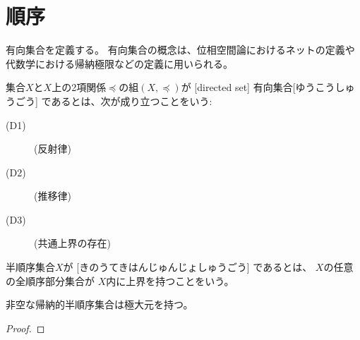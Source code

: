 \documentclass[report]{jlreq}
\begin{document}
\section{順序}

\begin{definition}[半順序]
    \TODO{}
\end{definition}

\begin{definition}[全順序]
    \TODO{}
\end{definition}

\begin{definition}[上界と下界]
    \TODO{}
\end{definition}

\begin{definition}[上限と下限]
    \TODO{}
\end{definition}

有向集合を定義する。
有向集合の概念は、位相空間論におけるネットの定義や
代数学における帰納極限などの定義に用いられる。

\begin{definition}[有向集合]
    集合$X$と$X$上の2項関係$\preceq$の組$(X, \preceq)$が
    [directed set]
        {有向集合}[ゆうこうしゅうごう]
    であるとは、次が成り立つことをいう:
    \begin{description}
        \item[(D1)] (反射律)
        \item[(D2)] (推移律)
        \item[(D3)] (共通上界の存在)
    \end{description}
    \TODO{}
\end{definition}

\begin{definition}[帰納的半順序集合]
    半順序集合$X$が
    [きのうてきはんじゅんじょしゅうごう]
    であるとは、
    $X$の任意の全順序部分集合が
    $X$内に上界を持つことをいう。
\end{definition}

\begin{theorem}
    非空な帰納的半順序集合は極大元を持つ。
\end{theorem}

\begin{proof}
    \TODO{}
\end{proof}

%
\end{document}
